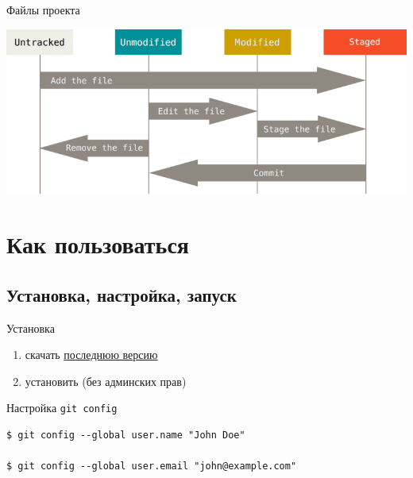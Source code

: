 \documentclass[presentation]{beamer}
\begin{document}
\begin{frame}[label={sec:org4326ee3}]{Файлы проекта}
\begin{center}
\includegraphics[width=.9\linewidth]{./01_vcs_01_git_file_states.png}
\end{center}
\end{frame}

\section{Как пользоваться}
\label{sec:orgab06db2}
\subsection{Установка, настройка, запуск}
\label{sec:org676f660}
\begin{frame}[label={sec:org3dd72b6}]{Установка}
\begin{enumerate}
\item скачать \href{https://git-scm.com/download/win}{последнюю версию}
\item установить (без админских прав)
\end{enumerate}
\end{frame}

\begin{frame}[fragile,label={sec:org8c886d0}]{Настройка}
 \alert{\texttt{git config}}

\begin{verbatim}
$ git config --global user.name "John Doe"

$ git config --global user.email "john@example.com"
\end{verbatim}
\end{frame}
\end{document}
